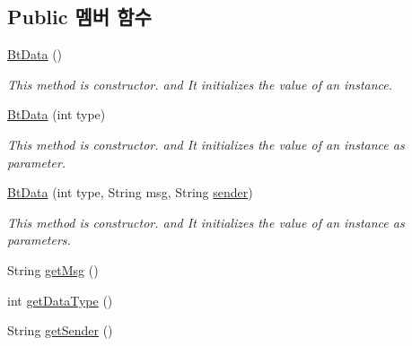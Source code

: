 \subsection*{Public 멤버 함수}
\begin{DoxyCompactItemize}
\item 
\hyperlink{classkr_1_1ac_1_1kookmin_1_1cs_1_1bluetooth_1_1_bt_data_ae6593841e31077f20d0bc233b60a9a2f}{Bt\+Data} ()
\begin{DoxyCompactList}\small\item\em This method is constructor. and It initializes the value of an instance. \end{DoxyCompactList}\item 
\hyperlink{classkr_1_1ac_1_1kookmin_1_1cs_1_1bluetooth_1_1_bt_data_aa0a4fd989f0eb9f6f3493a76ae23608a}{Bt\+Data} (int type)
\begin{DoxyCompactList}\small\item\em This method is constructor. and It initializes the value of an instance as parameter. \end{DoxyCompactList}\item 
\hyperlink{classkr_1_1ac_1_1kookmin_1_1cs_1_1bluetooth_1_1_bt_data_a61575981c4de913ce7fd0cd4b1d136e1}{Bt\+Data} (int type, String msg, String \hyperlink{classkr_1_1ac_1_1kookmin_1_1cs_1_1bluetooth_1_1_bt_data_ab940a1cb2ab153b6fce841ee88e07b0b}{sender})
\begin{DoxyCompactList}\small\item\em This method is constructor. and It initializes the value of an instance as parameters. \end{DoxyCompactList}\item 
String \hyperlink{classkr_1_1ac_1_1kookmin_1_1cs_1_1bluetooth_1_1_bt_data_af5b8fc603edec5fa24ff0be71424c45b}{get\+Msg} ()
\item 
int \hyperlink{classkr_1_1ac_1_1kookmin_1_1cs_1_1bluetooth_1_1_bt_data_afa5370a615b4826b88869b62a510c310}{get\+Data\+Type} ()
\item 
String \hyperlink{classkr_1_1ac_1_1kookmin_1_1cs_1_1bluetooth_1_1_bt_data_a3d2bc06cc574507b11a4b8c8f2759bb8}{get\+Sender} ()
\end{DoxyCompactItemize}
